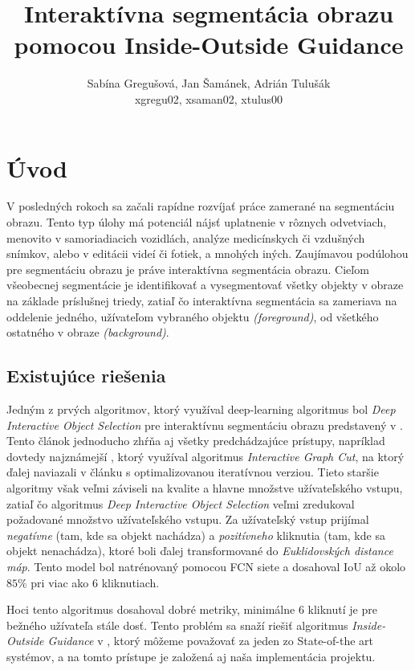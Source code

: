 \documentclass [11pt, a4paper, twocolumn]{article}
\begin{document}
\title{Interaktívna segmentácia obrazu pomocou Inside-Outside Guidance}
\author{Sabína Gregušová, Jan Šamánek, Adrián Tulušák\\xgregu02, xsaman02, xtulus00}
\date{}
\maketitle

\section{Úvod}
V posledných rokoch sa začali rapídne rozvíjať práce zamerané na segmentáciu obrazu. Tento typ úlohy má potenciál nájsť uplatnenie v rôznych odvetviach, menovito v samoriadiacich vozidlách, analýze medicínskych či vzdušných snímkov, alebo v editácii videí či fotiek, a mnohých iných. Zaujímavou podúlohou pre segmentáciu obrazu je práve interaktívna segmentácia obrazu. Cieľom všeobecnej segmentácie je identifikovať a vysegmentovať všetky objekty v obraze na základe príslušnej triedy, zatiaľ čo interaktívna segmentácia sa zameriava na oddelenie jedného, užívateľom vybraného objektu \textit{(foreground)}, od všetkého ostatného v obraze \textit{(background)}.

\subsection{Existujúce riešenia}
Jedným z prvých algoritmov, ktorý využíval deep-learning algoritmus bol \textit{Deep Interactive Object Selection} pre interaktívnu segmentáciu obrazu predstavený v \cite{xu_price_cohen_yang_huang_2016}. Tento článok jednoducho zhŕňa aj všetky predchádzajúce prístupy, napríklad dovtedy najznámejší \cite{boykov_jolly}, ktorý využíval algoritmus \textit{Interactive Graph Cut}, na ktorý ďalej naviazali v článku \cite{rother_kolmogorov_blake_2004} s optimalizovanou iteratívnou verziou. Tieto staršie algoritmy však veľmi záviseli na kvalite a hlavne množstve užívateľského vstupu, zatiaľ čo algoritmus \textit{Deep Interactive Object Selection} veľmi zredukoval požadované množstvo užívateľského vstupu. Za užívateľský vstup prijímal \textit{negatívne} (tam, kde sa objekt nachádza) a \textit{pozitívneho} kliknutia (tam, kde sa objekt nenachádza), ktoré boli ďalej transformované do \textit{Euklidovských distance máp}. Tento model bol natrénovaný pomocou FCN siete a dosahoval IoU až okolo $85\%$ pri viac ako 6 kliknutiach.

Hoci tento algoritmus dosahoval dobré metriky, minimálne 6 kliknutí je pre bežného užívateľa  stále dosť. Tento problém sa snaží riešiť algoritmus \textit{Inside-Outside Guidance} v \cite{zhang_liew_wei_wei_zhao_2020}, ktorý môžeme považovať za jeden zo State-of-the art systémov, a na tomto prístupe je založená aj naša implementácia projektu.
\end{document}
